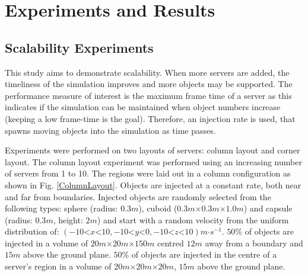 \chapter{Experiments and Results}
\section{Scalability Experiments}
This study aims to demonstrate scalability. When more servers are added, the timeliness of the simulation improves and more objects may be supported. The performance measure of interest is the maximum frame time of a server as this indicates if the simulation can be maintained when object numbers increase (keeping a low frame-time is the goal). Therefore, an injection rate is used, that spawns moving objects into the simulation as time passes.

Experiments were performed on two layouts of servers: column layout and corner layout. The column layout experiment was performed using an increasing number of servers from 1 to 10. The regions were laid out in a column configuration as shown in Fig. \ref{ColumnLayout}. Objects are injected at a constant rate, both near and far from boundaries. Injected objects are randomly selected from the following types: sphere (radius: $0.3m$), cuboid ($0.3m\mathord{\times}0.3m\mathord{\times}1.0m$) and capsule (radius: $0.3m$, height: $2m$) and start with a random velocity from the uniform distribution of: $(-10\mathord{<}x\mathord{<}10,-10\mathord{<}y\mathord{<}0,-10\mathord{<}z\mathord{<}10)m\mathord{\cdot}s^{-1}$. $50\%$ of objects are injected in a volume of $20m\mathord{\times}20m\mathord{\times}150m$ centred $12m$ away from a boundary and $15m$ above the ground plane. $50\%$ of objects are injected in the centre of a server's region in a volume of $20m\mathord{\times}20m\mathord{\times}20m$, $15m$ above the ground plane.

